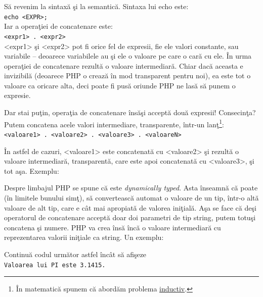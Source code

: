 Să revenim la sintaxă şi la semantică. Sintaxa lui echo este:\\
\texttt{echo <EXPR>;}\\
Iar a operaţiei de concatenare este:\\
\texttt{<expr1> . <expr2>}\\
<expr1> şi <expr2> pot fi orice fel de expresii, fie ele valori constante,
sau variabile -- deoarece variabilele au şi ele o valoare pe care
o cară cu ele. În urma operaţiei de concatenare rezultă o valoare
intermediară. Chiar dacă aceasta e {\glqq}invizibilă{\grqq} (deoarece
PHP o crează în mod transparent pentru noi), ea este tot o valoare ca oricare
alta, deci poate fi pusă oriunde PHP ne lasă să punem o expresie.

Dar stai puţin, operaţia de concatenare însăşi acceptă două expresii!
Consecinţa? Putem concatena acele valori intermediare, transparente,
într-un lanţ\footnote{În matematică spunem că abordăm problema
\href{http://en.wikipedia.org/wiki/Structural_induction}{inductiv}.}:\\
\texttt{<valoare1> . <valoare2> . <valoare3> . <valoareN>}

În astfel de cazuri, <valoare1> este concatenată cu <valoare2> şi rezultă
o valoare intermediară, transparentă, care este apoi concatenată cu <valoare3>,
şi tot aşa.
Exemplu:


Despre limbajul PHP se spune că este \textsl{dynamically typed}. Asta înseamnă
că poate (în limitele {\glqq}bunului simţ{\grqq}), să convertească automat
o valoare de un tip, într-o altă valoare de alt tip, care e cât
mai apropiată de valorea iniţială. Aşa se face că deşi operatorul
de concatenare acceptă doar doi parametri de tip string, putem totuşi
concatena şi numere. PHP va crea însă încă o valoare intermediară
cu reprezentarea valorii iniţiale ca string. Un exemplu:



\begin{Exercise}[title={Primul cod propriu}]
Continuă codul următor astfel încât să afişeze\\
\texttt{Valoarea lui PI este 3.1415.}

\end{Exercise}

